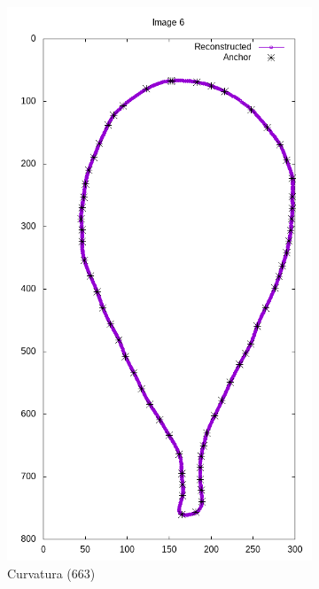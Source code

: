 \begin{frame}
\begin{figure}[ht!]
\begin{subfigure}[t]{0.24\textwidth}
			\includegraphics[width=\textwidth]{img/rec/6cur(663).png}
			\caption{Curvatura (663)}
		\end{subfigure}
		\begin{subfigure}[t]{0.24\textwidth}
			\centering

\end{subfigure}
\end{figure}
\end{frame}
